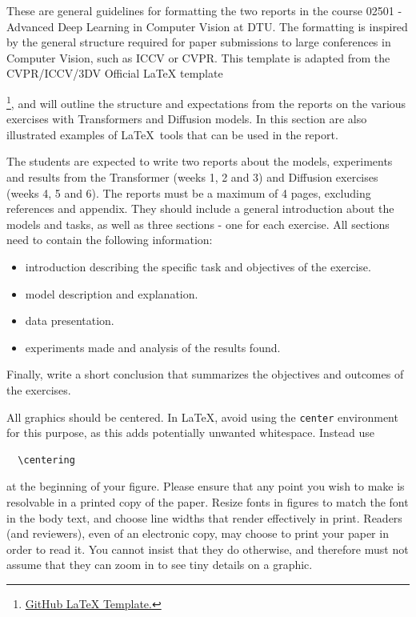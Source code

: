 These are general guidelines for formatting the two reports in the course 02501 - Advanced Deep Learning in Computer Vision at DTU. The formatting is inspired by the general structure required for paper submissions to large conferences in Computer Vision, such as ICCV or CVPR. This template is adapted from the CVPR/ICCV/3DV Official LaTeX template{\footnote{\href{https://github.com/cvpr-org/author-kit}{GitHub LaTeX Template.}}, and will outline the structure and expectations from the reports on the various exercises with Transformers and Diffusion models. In this section are also illustrated examples of \LaTeX\ tools that can be used in the report. 

The students are expected to write two reports about the models, experiments and results from the Transformer (weeks 1, 2 and 3) and Diffusion exercises (weeks 4, 5 and 6). The reports must be a maximum of 4 pages, excluding references and appendix. They should include a general introduction about the models and tasks, as well as three sections - one for each exercise. All sections need to contain the following information:
\begin{itemize}
    \item [-] introduction describing the specific task and objectives of the exercise.
    \item [-] model description and explanation.
    \item [-] data presentation.
    \item [-] experiments made and analysis of the results found.
\end{itemize}

\noindent
Finally, write a short conclusion that summarizes the objectives and outcomes of the exercises.



All graphics should be centered.
In \LaTeX, avoid using the \texttt{center} environment for this purpose, as this adds potentially unwanted whitespace.
Instead use
{\small\begin{verbatim}
  \centering
\end{verbatim}}
at the beginning of your figure.
Please ensure that any point you wish to make is resolvable in a printed copy of the paper.
Resize fonts in figures to match the font in the body text, and choose line widths that render effectively in print.
Readers (and reviewers), even of an electronic copy, may choose to print your paper in order to read it.
You cannot insist that they do otherwise, and therefore must not assume that they can zoom in to see tiny details on a graphic.

}
